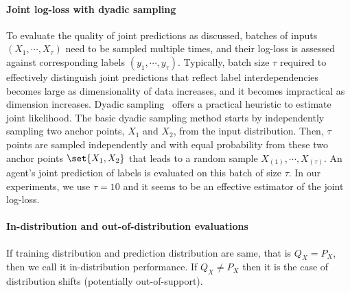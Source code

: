 \paragraph{Joint log-loss with dyadic sampling} 
To evaluate the quality of joint predictions as discussed, batches of inputs $(X_1, \cdots, X_\tau)$ need to be sampled multiple times, and their log-loss is assessed against corresponding labels $(y_1, \cdots, y_\tau)$. 
Typically, batch size $\tau$ required to effectively distinguish joint predictions that reflect label interdependencies becomes large as dimensionality of data increases, and it becomes impractical as dimension increases. 
Dyadic sampling~\citep{OsbandWeAsDwLuIbLaHaDoRo22} offers a practical heuristic to estimate joint likelihood.
The basic dyadic sampling method starts by independently sampling two anchor points, $X_1$ and $X_2$, from the input distribution. Then, $\tau$ points are sampled independently and with equal probability from these two anchor points $\set{X_1, X_2}$ that leads to a random sample $X_{(1)}, \cdots, X_{(\tau)}$.
An agent's joint prediction of labels is evaluated on this batch of size $\tau$.  In our experiments, we use $\tau = 10$ and it seems to be an effective estimator of the joint log-loss.



\paragraph{In-distribution and out-of-distribution evaluations} If training distribution and prediction distribution are same, that is $Q_X =P_X$, then we call it in-distribution performance. If $Q_X \neq P_X$  then it is the case of distribution shifts (potentially out-of-support).

